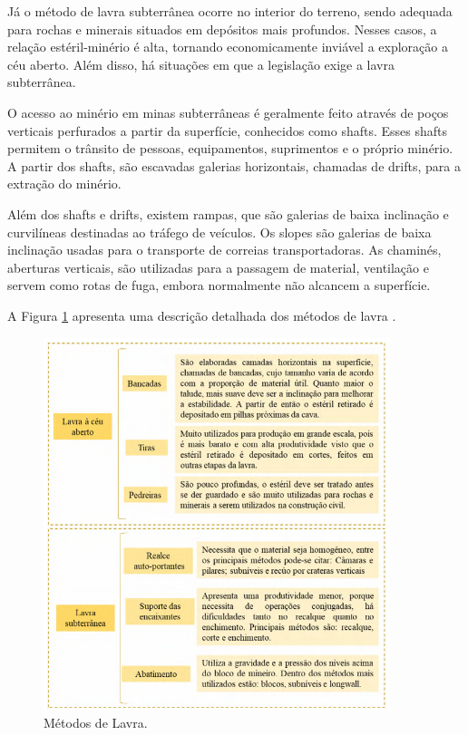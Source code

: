 Já o método de lavra subterrânea ocorre no interior do terreno, sendo
adequada para rochas e minerais situados em depósitos mais profundos.
Nesses casos, a relação estéril-minério é alta, tornando economicamente
inviável a exploração a céu aberto. Além disso, há situações em que a
legislação exige a lavra subterrânea.

O acesso ao minério em minas subterrâneas é geralmente feito através de
poços verticais perfurados a partir da superfície, conhecidos como
shafts. Esses shafts permitem o trânsito de pessoas, equipamentos,
suprimentos e o próprio minério. A partir dos shafts, são escavadas
galerias horizontais, chamadas de drifts, para a extração do minério.

Além dos shafts e drifts, existem rampas, que são galerias de baixa
inclinação e curvilíneas destinadas ao tráfego de veículos. Os slopes
são galerias de baixa inclinação usadas para o transporte de correias
transportadoras. As chaminés, aberturas verticais, são utilizadas para a
passagem de material, ventilação e servem como rotas de fuga, embora
normalmente não alcancem a superfície.

A Figura \ref{fig:metodos_lavra} apresenta uma descrição detalhada dos métodos de lavra
\cite{freire2020rejeitos}.

\begin{figure}[!htb]
    \centering
    \includegraphics[width=0.9\textwidth]{figures/image15_metodos_lavra.png}
    \caption{Métodos de Lavra.}
    \label{fig:metodos_lavra}
\end{figure}

